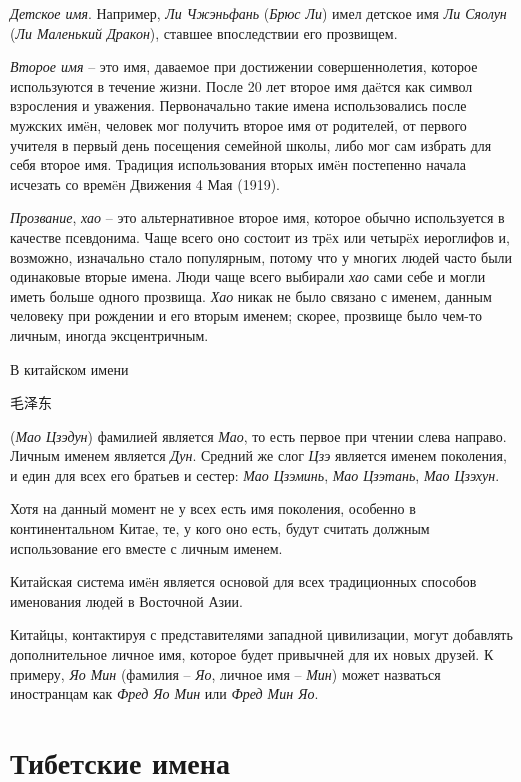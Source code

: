 \emph{Детское имя}. Например, \emph{Ли Чжэньфань} (\emph{Брюс Ли}) имел детское имя \emph{Ли Сяолун} (\emph{Ли Маленький Дракон}), ставшее впоследствии его прозвищем.

\emph{Второе имя} -- это имя, даваемое при достижении совершеннолетия, которое используются в течение жизни. После 20 лет второе имя да\"eтся как символ взросления и уважения. Первоначально такие имена использовались после мужских им\"eн, человек мог получить второе имя от родителей, от первого учителя в первый день посещения семейной школы, либо мог сам избрать для себя второе имя. Традиция использования вторых им\"eн постепенно начала исчезать со врем\"eн Движения 4 Мая (1919). 

\emph{Прозвание}, \emph{хао} -- это альтернативное второе имя, которое обычно используется в качестве псевдонима. Чаще всего оно состоит из тр\"eх или четыр\"eх иероглифов и, возможно, изначально стало популярным, потому что у многих людей часто были одинаковые вторые имена. Люди чаще всего выбирали \emph{хао} сами себе и могли иметь больше одного прозвища. \emph{Хао} никак не было связано с именем, данным человеку при рождении и его вторым именем; скорее, прозвище было чем-то личным, иногда эксцентричным.

В китайском имени \begin{CJK*}{UTF8}{gbsn} 毛泽东 \end{CJK*}  (\emph{Мао Цзэдун}) фамилией является \emph{Мао}, то есть первое при чтении слева направо. Личным именем является \emph{Дун}. Средний же слог \emph{Цзэ} является именем поколения, и един для всех его братьев и сестер: \emph{Мао Цзэминь}, \emph{Мао Цзэтань}, \emph{Мао Цзэхун}.

Хотя на данный момент не у всех есть имя поколения, особенно в континентальном Китае, те, у кого оно есть, будут считать должным использование его вместе с личным именем.

Китайская система им\"eн является основой для всех традиционных способов именования людей в Восточной Азии.

Китайцы, контактируя с представителями западной цивилизации, могут добавлять дополнительное личное имя, которое будет привычней для их новых друзей. К примеру, \emph{Яо Мин} (фамилия -- \emph{Яо}, личное имя -- \emph{Мин}) может назваться иностранцам как \emph{Фред Яо Мин} или \emph{Фред Мин Яо}.


\section{Тибетские имена}

